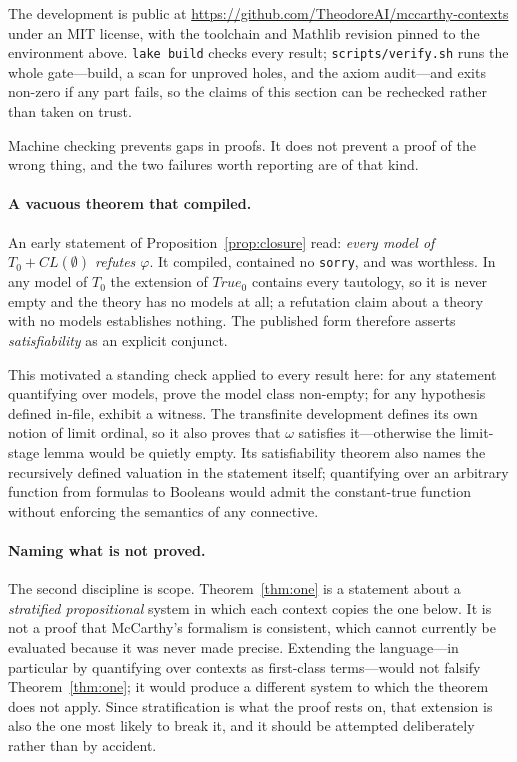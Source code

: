 \documentclass[11pt]{article}
\theoremstyle{plain}
\theoremstyle{remark}
\newcommand{\True}{\mathit{True}}
\newcommand{\CL}{\mathit{CL}}
\begin{document}
The development is public at
\url{https://github.com/TheodoreAI/mccarthy-contexts} under an MIT license, with
the toolchain and Mathlib revision pinned to the environment above.
\texttt{lake build} checks every result; \texttt{scripts/verify.sh} runs the
whole gate---build, a scan for unproved holes, and the axiom audit---and exits
non-zero if any part fails, so the claims of this section can be rechecked
rather than taken on trust.

Machine checking prevents gaps in proofs. It does not prevent a proof of the
wrong thing, and the two failures worth reporting are of that kind.

\paragraph{A vacuous theorem that compiled.}
An early statement of Proposition~\ref{prop:closure} read: \emph{every model of
$T_0 + \CL(\emptyset)$ refutes $\varphi$}. It compiled, contained no
\texttt{sorry}, and was worthless. In any model of $T_0$ the extension of
$\True_0$ contains every tautology, so it is never empty and the theory has no
models at all; a refutation claim about a theory with no models establishes
nothing. The published form therefore asserts \emph{satisfiability} as an
explicit conjunct.

This motivated a standing check applied to every result here: for any statement
quantifying over models, prove the model class non-empty; for any hypothesis
defined in-file, exhibit a witness. The transfinite development defines its own
notion of limit ordinal, so it also proves that $\omega$ satisfies it---otherwise
the limit-stage lemma would be quietly empty. Its satisfiability theorem also
names the recursively defined valuation in the statement itself; quantifying
over an arbitrary function from formulas to Booleans would admit the
constant-true function without enforcing the semantics of any connective.

\paragraph{Naming what is not proved.}
The second discipline is scope. Theorem~\ref{thm:one} is a statement about a
\emph{stratified propositional} system in which each context copies the one
below. It is not a proof that McCarthy's formalism is consistent, which cannot
currently be evaluated because it was never made precise. Extending the
language---in particular by quantifying over contexts as first-class
terms---would not falsify Theorem~\ref{thm:one}; it would produce a different
system to which the theorem does not apply. Since stratification is what the
proof rests on, that extension is also the one most likely to break it, and it
should be attempted deliberately rather than by accident.
\end{document}
